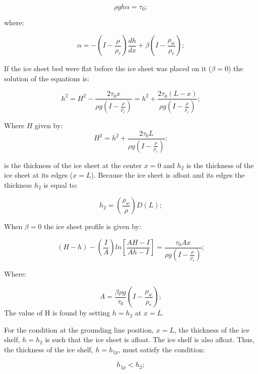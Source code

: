 \documentclass{article}
\begin{document}
\begin{equation}
	\rho gh\alpha=\tau_0;
\end{equation}

where:

\begin{equation}
	\alpha=-(I-\frac{\rho}{\rho_r})\frac{dh}{dx}+\beta(I-\frac{\rho_w}{\rho_r});
\end{equation}

If the ice sheet bed were flat before the ice sheet was placed on it ($\beta=0$) the solution of the equations is:

\begin{equation}
	h^2=H^2-\frac{2\tau_0x}{\rho g(I-\frac{\rho}{\rho_r})}= h^2+\frac{2\tau_0(L-x)}{\rho g(I-\frac{\rho}{\rho_r})};
\end{equation}

Where $H$ given by:
\begin{equation}
	H^2=h^2+\frac{2\tau_0L}{\rho g(I-\frac{\rho}{\rho_r})};
\end{equation}

is the thickness of the ice sheet at the center $x=0$ and $h_2$ is the thickness of the ice sheet at its edges ($x=L$). Because the ice sheet is afloat and its edges the thickness $h_2$ is equal to:

\begin{equation}
	h_2=(\frac{\rho_w}{\rho})D(L);
\end{equation}

When $\beta=0$ the ice sheet profile is given by:

\begin{equation}
	(H-h)-(\frac{I}{A})ln[\frac{AH-I}{Ah-I}]=\frac{\tau_0 Ax}{\rho g(I-\frac{\rho}{\rho_r})};
\end{equation} 

Where:

\begin{equation}
	A=\frac{\beta \rho g}{\tau_0}(I-\frac{\rho_w}{\rho_r});
\end{equation}
The value of H is found by setting $h=h_2$ at $x=L$.

For the condition at the grounding line position, $x=L$, the thickness of the ice shelf, $h=h_2$ is such that the ice sheet is afloat. The ice shelf is also afloat. Thus, the thickness of the ice shelf, $h=h_{1p}$, must satisfy the condition:

\begin{equation}
	h_{1p}<h_2;
\end{equation}
\end{document}
